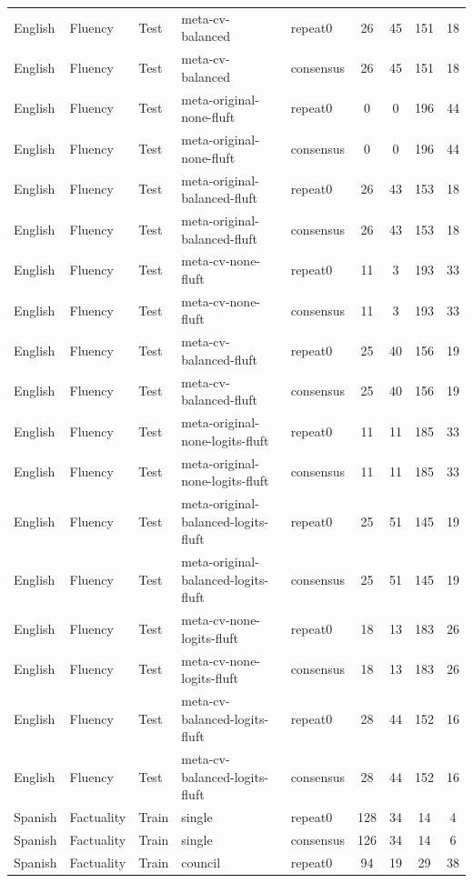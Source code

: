 \begin{tabular}{lllllcccc}
English & Fluency & Test & meta-cv-balanced & repeat0 & 26 & 45 & 151 & 18 \\
English & Fluency & Test & meta-cv-balanced & consensus & 26 & 45 & 151 & 18 \\
English & Fluency & Test & meta-original-none-fluft & repeat0 & 0 & 0 & 196 & 44 \\
English & Fluency & Test & meta-original-none-fluft & consensus & 0 & 0 & 196 & 44 \\
English & Fluency & Test & meta-original-balanced-fluft & repeat0 & 26 & 43 & 153 & 18 \\
English & Fluency & Test & meta-original-balanced-fluft & consensus & 26 & 43 & 153 & 18 \\
English & Fluency & Test & meta-cv-none-fluft & repeat0 & 11 & 3 & 193 & 33 \\
English & Fluency & Test & meta-cv-none-fluft & consensus & 11 & 3 & 193 & 33 \\
English & Fluency & Test & meta-cv-balanced-fluft & repeat0 & 25 & 40 & 156 & 19 \\
English & Fluency & Test & meta-cv-balanced-fluft & consensus & 25 & 40 & 156 & 19 \\
English & Fluency & Test & meta-original-none-logits-fluft & repeat0 & 11 & 11 & 185 & 33 \\
English & Fluency & Test & meta-original-none-logits-fluft & consensus & 11 & 11 & 185 & 33 \\
English & Fluency & Test & meta-original-balanced-logits-fluft & repeat0 & 25 & 51 & 145 & 19 \\
English & Fluency & Test & meta-original-balanced-logits-fluft & consensus & 25 & 51 & 145 & 19 \\
English & Fluency & Test & meta-cv-none-logits-fluft & repeat0 & 18 & 13 & 183 & 26 \\
English & Fluency & Test & meta-cv-none-logits-fluft & consensus & 18 & 13 & 183 & 26 \\
English & Fluency & Test & meta-cv-balanced-logits-fluft & repeat0 & 28 & 44 & 152 & 16 \\
English & Fluency & Test & meta-cv-balanced-logits-fluft & consensus & 28 & 44 & 152 & 16 \\
Spanish & Factuality & Train & single & repeat0 & 128 & 34 & 14 & 4 \\
Spanish & Factuality & Train & single & consensus & 126 & 34 & 14 & 6 \\
Spanish & Factuality & Train & council & repeat0 & 94 & 19 & 29 & 38 \\

\end{tabular}
